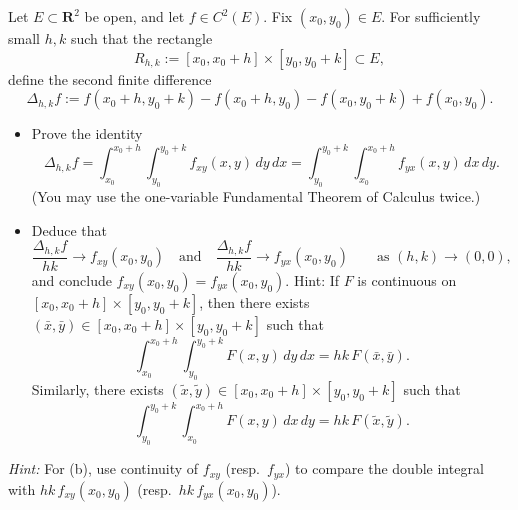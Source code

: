 \begin{problem}
    Let $E\subset\mathbf{R}^2$ be open, and let $f\in C^2(E)$.
Fix $(x_0,y_0)\in E$.  For sufficiently small $h,k$ such that the rectangle
\[
R_{h,k}:=[x_0,x_0+h]\times [y_0,y_0+k]\subset E,
\]
define the second finite difference
\[
\Delta_{h,k} f
:=
f(x_0+h,y_0+k)-f(x_0+h,y_0)-f(x_0,y_0+k)+f(x_0,y_0).
\]
\begin{itemize}
\item[(a)] Prove the identity
\[
\Delta_{h,k} f
=
\int_{x_0}^{x_0+h}\int_{y_0}^{y_0+k} f_{xy}(x,y)\,dy\,dx
=
\int_{y_0}^{y_0+k}\int_{x_0}^{x_0+h} f_{yx}(x,y)\,dx\,dy.
\]
(You may use the one-variable Fundamental Theorem of Calculus twice.)
\item[(b)] Deduce that
\[
\frac{\Delta_{h,k} f}{hk}\to f_{xy}(x_0,y_0)
\quad\text{and}\quad
\frac{\Delta_{h,k} f}{hk}\to f_{yx}(x_0,y_0)
\qquad\text{as }(h,k)\to(0,0),
\]
and conclude $f_{xy}(x_0,y_0)=f_{yx}(x_0,y_0)$. Hint:  If $F$ is continuous on $[x_0,x_0+h]\times [y_0,y_0+k]$, then there exists
$(\bar x,\bar y)\in [x_0,x_0+h]\times [y_0,y_0+k]$ such that
\[
\int_{x_0}^{x_0+h}\int_{y_0}^{y_0+k} F(x,y)\,dy\,dx
= hk\,F(\bar x,\bar y).
\]
Similarly, there exists $(\tilde x,\tilde y)\in [x_0,x_0+h]\times [y_0,y_0+k]$ such that
\[
\int_{y_0}^{y_0+k}\int_{x_0}^{x_0+h} F(x,y)\,dx\,dy
= hk\,F(\tilde x,\tilde y).
\]

\end{itemize}

\medskip
\noindent\emph{Hint:} For (b), use continuity of $f_{xy}$ (resp.\ $f_{yx}$) to compare the double integral with $hk\,f_{xy}(x_0,y_0)$ (resp.\ $hk\,f_{yx}(x_0,y_0)$).
\end{problem}

